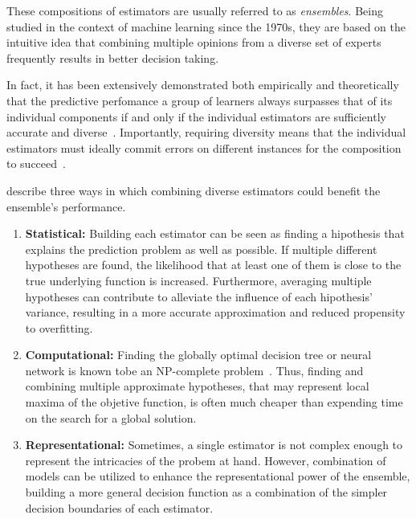 These compositions of estimators are usually referred to as \emph{ensembles}. Being studied in the context of machine learning since the 1970s, they are based on the intuitive idea that combining multiple opinions from a diverse set of experts frequently results in better decision taking. %


In fact, it has been extensively demonstrated both empirically and theoretically that the predictive perfomance a group of learners always surpasses that of its individual components if and only if the individual estimators are sufficiently accurate and diverse~\cite{dieterich2000}.%
Importantly, requiring diversity means that the individual estimators must ideally commit errors on different instances for the composition to succeed~\cite{polikar2006ensemble}.

\textcite{dietterich2000ensemble,polikar2006ensemble} describe three ways in which combining diverse estimators could benefit the ensemble's performance.

\begin{enumerate}
    \item \textbf{Statistical:} Building each estimator can be seen as finding a hipothesis that explains the prediction problem as well as possible. If multiple different hypotheses are found, the likelihood that at least one of them is close to the true underlying function is increased. Furthermore, averaging multiple hypotheses can contribute to alleviate the influence of each hipothesis' variance, resulting in a more accurate approximation and reduced propensity to overfitting.
    \item \textbf{Computational:} Finding the globally optimal decision tree or neural network is known tobe an NP-complete problem~\cite{}. Thus, finding and combining multiple approximate hypotheses, that may represent local maxima of the objetive function, is often much cheaper than expending time on the search for a global solution. %
    \item \textbf{Representational:} Sometimes, a single estimator is not complex enough to represent the intricacies of the probem at hand. However, combination of models can be utilized to enhance the representational power of the ensemble, building a more general decision function as a combination of the simpler decision boundaries of each estimator.  %
\end{enumerate}

